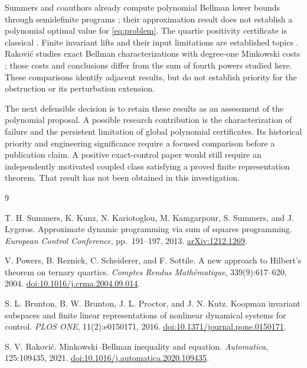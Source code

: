 \documentclass[10pt]{article}
\begin{document}
Summers and coauthors already compute polynomial Bellman lower bounds through semidefinite programs \cite{summers}; their approximation result does not establish a polynomial optimal value for \eqref{eq:problem}. The quartic positivity certificate is classical \cite{powers}. Finite invariant lifts and their input limitations are established topics \cite{brunton}. Rakovi\'c studies exact Bellman characterizations with degree-one Minkowski costs \cite{rakovic}; those costs and conclusions differ from the sum of fourth powers studied here. These comparisons identify adjacent results, but do not establish priority for the obstruction or its perturbation extension.

The next defensible decision is to retain these results as an assessment of the polynomial proposal. A possible research contribution is the characterization of failure and the persistent limitation of global polynomial certificates. Its historical priority and engineering significance require a focused comparison before a publication claim. A positive exact-control paper would still require an independently motivated coupled class satisfying a proved finite representation theorem. That result has not been obtained in this investigation.

\begin{thebibliography}{9}
\raggedright
{}
T. H. Summers, K. Kunz, N. Kariotoglou, M. Kamgarpour, S. Summers, and J. Lygeros.
Approximate dynamic programming via sum of squares programming.
\emph{European Control Conference}, pp.~191--197, 2013.
\href{https://arxiv.org/abs/1212.1269}{arXiv:1212.1269}.

V. Powers, B. Reznick, C. Scheiderer, and F. Sottile.
A new approach to Hilbert's theorem on ternary quartics.
\emph{Comptes Rendus Math\'ematique}, 339(9):617--620, 2004.
\href{https://doi.org/10.1016/j.crma.2004.09.014}{doi:10.1016/j.crma.2004.09.014}.

S. L. Brunton, B. W. Brunton, J. L. Proctor, and J. N. Kutz.
Koopman invariant subspaces and finite linear representations of nonlinear dynamical systems for control.
\emph{PLOS ONE}, 11(2):e0150171, 2016.
\href{https://doi.org/10.1371/journal.pone.0150171}{doi:10.1371/journal.pone.0150171}.

S. V. Rakovi\'c.
Minkowski--Bellman inequality and equation.
\emph{Automatica}, 125:109435, 2021.
\href{https://doi.org/10.1016/j.automatica.2020.109435}{doi:10.1016/j.automatica.2020.109435}.
\end{thebibliography}
\end{document}
